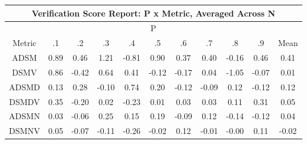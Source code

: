 \begin{longtable}{ | c || c | c | c | c | c | c | c | c | c || c |}
\hline
\multicolumn{11}{|c|}{ Verification Score Report: P x Metric, Averaged Across N } \\
\hline
\multicolumn{11}{|c|}{ P } \\
\hline
Metric & .1 & .2 & .3 & .4 & .5 & .6 & .7 & .8 & .9 & Mean\\
\hline
\hline
\endhead
ADSM &  \cellcolor[HTML]{E7E7FF} 0.89 &  \cellcolor[HTML]{F7F7FF} 0.46 &  \cellcolor[HTML]{DFDFFF} 1.21 &  \cellcolor[HTML]{FFE7E7} -0.81 &  \cellcolor[HTML]{E7E7FF} 0.90 &  \cellcolor[HTML]{F7F7FF} 0.37 &  \cellcolor[HTML]{F7F7FF} 0.40 &  \cellcolor[HTML]{FFF7F7} -0.16 &  \cellcolor[HTML]{F7F7FF} 0.46 &  \cellcolor[HTML]{F7F7FF} 0.41 \\
DSMV &  \cellcolor[HTML]{E7E7FF} 0.86 &  \cellcolor[HTML]{FFF7F7} -0.42 &  \cellcolor[HTML]{EFEFFF} 0.64 &  \cellcolor[HTML]{F7F7FF} 0.41 &  \cellcolor[HTML]{FFFFFF} -0.12 &  \cellcolor[HTML]{FFF7F7} -0.17 &  \cellcolor[HTML]{FFFFFF} 0.04 &  \cellcolor[HTML]{FFE7E7} -1.05 &  \cellcolor[HTML]{FFFFFF} -0.07 &  \cellcolor[HTML]{FFFFFF} 0.01 \\
ADSMD &  \cellcolor[HTML]{FFFFFF} 0.13 &  \cellcolor[HTML]{F7F7FF} 0.28 &  \cellcolor[HTML]{FFFFFF} -0.10 &  \cellcolor[HTML]{EFEFFF} 0.74 &  \cellcolor[HTML]{F7F7FF} 0.20 &  \cellcolor[HTML]{FFFFFF} -0.12 &  \cellcolor[HTML]{FFFFFF} -0.09 &  \cellcolor[HTML]{FFFFFF} 0.12 &  \cellcolor[HTML]{FFFFFF} -0.12 &  \cellcolor[HTML]{FFFFFF} 0.12 \\
DSMDV &  \cellcolor[HTML]{F7F7FF} 0.35 &  \cellcolor[HTML]{FFF7F7} -0.20 &  \cellcolor[HTML]{FFFFFF} 0.02 &  \cellcolor[HTML]{FFF7F7} -0.23 &  \cellcolor[HTML]{FFFFFF} 0.01 &  \cellcolor[HTML]{FFFFFF} 0.03 &  \cellcolor[HTML]{FFFFFF} 0.03 &  \cellcolor[HTML]{FFFFFF} 0.11 &  \cellcolor[HTML]{F7F7FF} 0.31 &  \cellcolor[HTML]{FFFFFF} 0.05 \\
ADSMN &  \cellcolor[HTML]{FFFFFF} 0.03 &  \cellcolor[HTML]{FFFFFF} -0.06 &  \cellcolor[HTML]{F7F7FF} 0.25 &  \cellcolor[HTML]{FFFFFF} 0.15 &  \cellcolor[HTML]{F7F7FF} 0.19 &  \cellcolor[HTML]{FFFFFF} -0.09 &  \cellcolor[HTML]{FFFFFF} 0.12 &  \cellcolor[HTML]{FFFFFF} -0.14 &  \cellcolor[HTML]{FFFFFF} -0.12 &  \cellcolor[HTML]{FFFFFF} 0.04 \\
DSMNV &  \cellcolor[HTML]{FFFFFF} 0.05 &  \cellcolor[HTML]{FFFFFF} -0.07 &  \cellcolor[HTML]{FFFFFF} -0.11 &  \cellcolor[HTML]{FFF7F7} -0.26 &  \cellcolor[HTML]{FFFFFF} -0.02 &  \cellcolor[HTML]{FFFFFF} 0.12 &  \cellcolor[HTML]{FFFFFF} -0.01 &  \cellcolor[HTML]{FFFFFF} -0.00 &  \cellcolor[HTML]{FFFFFF} 0.11 &  \cellcolor[HTML]{FFFFFF} -0.02 \\

\end{longtable}
